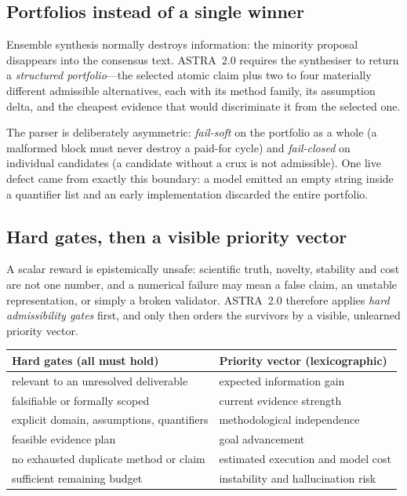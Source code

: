 \documentclass[11pt,a4paper]{article}
\begin{document}
\subsection{Portfolios instead of a single winner}

Ensemble synthesis normally destroys information: the minority proposal
disappears into the consensus text. ASTRA~2.0 requires the synthesiser to return
a \emph{structured portfolio}---the selected atomic claim plus two to four
materially different admissible alternatives, each with its method family, its
assumption delta, and the cheapest evidence that would discriminate it from the
selected one.

The parser is deliberately asymmetric: \emph{fail-soft} on the portfolio as a
whole (a malformed block must never destroy a paid-for cycle) and
\emph{fail-closed} on individual candidates (a candidate without a crux is not
admissible). One live defect came from exactly this boundary: a model emitted an
empty string inside a quantifier list and an early implementation discarded the
entire portfolio.

\subsection{Hard gates, then a visible priority vector}

A scalar reward is epistemically unsafe: scientific truth, novelty, stability
and cost are not one number, and a numerical failure may mean a false claim, an
unstable representation, or simply a broken validator. ASTRA~2.0 therefore
applies \emph{hard admissibility gates} first, and only then orders the
survivors by a visible, unlearned priority vector.

\begin{center}
\small
\begin{tabular}{@{}p{7.1cm}p{7.1cm}@{}}
\toprule
\textbf{Hard gates (all must hold)} & \textbf{Priority vector (lexicographic)} \\
\midrule
relevant to an unresolved deliverable & expected information gain \\
falsifiable or formally scoped & current evidence strength \\
explicit domain, assumptions, quantifiers & methodological independence \\
feasible evidence plan & goal advancement \\
no exhausted duplicate method or claim & estimated execution and model cost \\
sufficient remaining budget & instability and hallucination risk \\
\bottomrule
\end{tabular}
\end{center}
\end{document}
